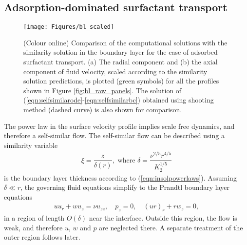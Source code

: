 \documentclass[]{jfm}
\begin{document}
\subsection{Adsorption-dominated surfactant transport}
\label{sec:insolsim}


\begin{figure}
\centerline{\texttt{[image: Figures/bl\_scaled]}}
\caption{(Colour online) Comparison of the computational solutions with the similarity solution in the boundary layer for the case of adsorbed surfactant transport. 
(a) The radial component and (b) the axial component of fluid velocity, scaled according to the similarity solution predictions, is plotted (green symbols) for all the profiles shown in Figure \ref{fig:bl_raw_panels}. 
The solution of (\ref{eqn:selfsimilarode}-\ref{eqn:selfsimilarbc}) obtained using shooting method (dashed curve) is also shown for comparison. 
}
\label{fig:bl_scaled}
\end{figure}


The power law in the surface velocity profile implies scale free dynamics, and therefore a self-similar flow.
The self-similar flow can be described using a similarity variable
\begin{align}
 \xi = \dfrac{z}{\delta(r)}, \text{ where } \delta = \dfrac{\nu^{2/5} r^{4/5}}{K_2^{1/5}}
 \label{eqn:bldef}
\end{align}
is the boundary layer thickness according to (\ref{eqn:insolpowerlaws}). Assuming $\delta \ll r$, the governing fluid equations simplify to the Prandtl boundary layer equations
\begin{align}
 uu_r + w u_z = \nu u_{zz}, \quad p_z = 0, \quad (ur)_r + rw_z = 0, \label{eqn:prandtlbleqn}
\end{align}
in a region of length $O(\delta)$ near the interface.
Outside this region, the flow is weak, and therefore $u$, $w$ and $p$ are neglected there.
A separate treatment of the outer region follows later. 
\end{document}
